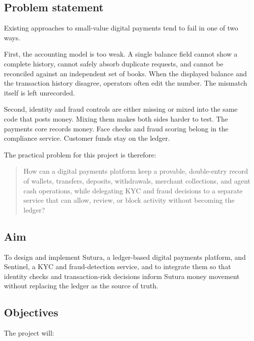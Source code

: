 \documentclass[12pt,a4paper]{article}
\begin{document}
\subsection{Problem statement}

Existing approaches to small-value digital payments tend to fail in one of two ways.

First, the accounting model is too weak. A single balance field cannot show a complete history, cannot safely absorb duplicate requests, and cannot be reconciled against an independent set of books. When the displayed balance and the transaction history disagree, operators often edit the number. The mismatch itself is left unrecorded.

Second, identity and fraud controls are either missing or mixed into the same code that posts money. Mixing them makes both sides harder to test. The payments core records money. Face checks and fraud scoring belong in the compliance service. Customer funds stay on the ledger.

The practical problem for this project is therefore:

\begin{quote}
How can a digital payments platform keep a provable, double-entry record of wallets, transfers, deposits, withdrawals, merchant collections, and agent cash operations, while delegating KYC and fraud decisions to a separate service that can allow, review, or block activity without becoming the ledger?
\end{quote}

\subsection{Aim}

To design and implement Sutura, a ledger-based digital payments platform, and Sentinel, a KYC and fraud-detection service, and to integrate them so that identity checks and transaction-risk decisions inform Sutura money movement without replacing the ledger as the source of truth.

\subsection{Objectives}

The project will:
\end{document}
